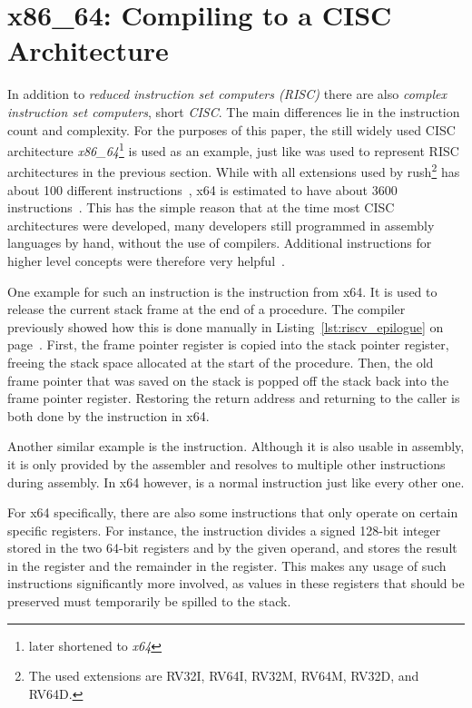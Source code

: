 \newpage
\section{x86\_64: Compiling to a CISC Architecture}

In addition to \emph{reduced instruction set computers (RISC)} there are also \emph{complex instruction set computers}, short \emph{CISC}.
The main differences lie in the instruction count and complexity.
For the purposes of this paper, the still widely used CISC architecture \emph{x86\_64}\footnote{later shortened to \emph{x64}} is used as an example, just like \riscv{} was used to represent RISC architectures in the previous section.
While \riscv{} with all extensions used by rush\footnote{The used extensions are RV32I, RV64I, RV32M, RV64M, RV32D, and RV64D.} has about 100 different instructions~\cite[Chapter~24]{Waterman2019}, x64 is estimated to have about 3600 instructions~\cite{Rodgers2017}.
This has the simple reason that at the time most CISC architectures were developed, many developers still programmed in assembly languages by hand, without the use of compilers.
Additional instructions for higher level concepts were therefore very helpful~\cite[p.~9]{Dandamudi2005Risc}.

One example for such an instruction is the  instruction from x64.
It is used to release the current stack frame at the end of a procedure.
The \riscv{} compiler previously showed how this is done manually in Listing~\ref{lst:riscv_epilogue} on page~\pageref{lst:riscv_epilogue}.
First, the frame pointer register is copied into the stack pointer register, freeing the stack space allocated at the start of the procedure.
Then, the old frame pointer that was saved on the stack is popped off the stack back into the frame pointer register.
Restoring the return address and returning to the caller is both done by the  instruction in x64.

Another similar example is the  instruction.
Although it is also usable in \riscv{} assembly, it is only provided by the assembler and resolves to multiple other \riscv{} instructions during assembly.
In x64 however,  is a normal instruction just like every other one.

For x64 specifically, there are also some instructions that only operate on certain specific registers.
For instance, the \label{x64_idiv} instruction divides a signed 128-bit integer stored in the two 64-bit registers  and  by the given operand, and stores the result in the  register and the remainder in the  register. This makes any usage of such instructions significantly more involved, as values in these registers that should be preserved must temporarily be spilled to the stack.

